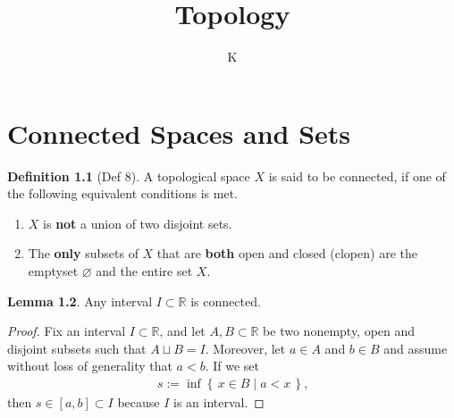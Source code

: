 \documentclass[a4paper]{book}
\title{Topology}
\author{K}
\theoremstyle{definition}
\newtheorem{definition}{Definition}[]
\newtheorem{lemma}[definition]{Lemma}
\newcommand{\makeset}[2]{\left\{\, #1 \mid #2 \,\right\}}
\begin{document}
\maketitle
\tableofcontents

    \chapter{Connected Spaces and Sets}
    \begin{defbox}
        \begin{definition}[Def 8]
            A {\color{mathobj}topological space} \(X\) is said to be {\color{maththen}connected}, if one of the following {\color{mathrem}equivalent} conditions is met.
            \begin{enumerate}
                \item \(X\) is \textbf{not} a {\color{mathif}union} of two {\color{mathif}disjoint} sets.
                \item The \textbf{only} {\color{mathif}subsets} of \(X\) that are \textbf{both} {\color{mathif}open} and {\color{mathif}closed} ({\color{mathrem}clopen}) are the emptyset \(\varnothing\) and the entire set \(X\).
            \end{enumerate}
        \end{definition}
    \end{defbox}

\begin{thmbox}
    \begin{lemma}
        Any {\color{mathif}interval} \(I \subset \mathbb{R}\) is {\color{maththen}connected}.
    \end{lemma}
\end{thmbox}

\begin{proof}
    Fix an interval \(I \subset \mathbb{R}\), and let \(A, B \subset \mathbb{R}\) be two nonempty, open and disjoint subsets such that \(A \sqcup B = I\). Moreover, let \(a \in A\) and \(b \in B\) and assume without loss of generality that \(a < b\). If we set
    \begin{align}
        s := \inf \makeset{x \in B}{a < x} \text{,}
    \end{align}
    then \(s \in [a, b] \subset I\) because \(I\) is an interval.   
\end{proof}
\end{document}

